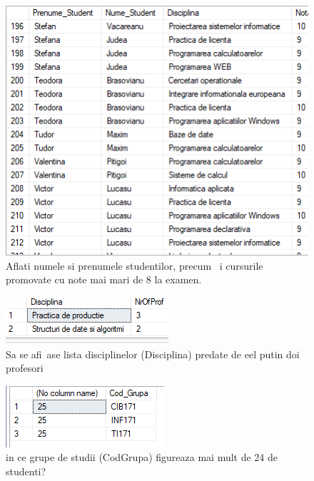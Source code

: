 \documentclass[12pt]{article}
\begin{document}
        \begin{figure}[H]
                \centering
                \includegraphics[width=.85\textwidth]{img14.png}
                \caption{Aflati numele si prenumele studentilor, precum ~i cursurile promovate cu note mai mari de 8 la examen.}
        \end{figure}
        \vspace{0.5 cm}

        \begin{figure}[H]
                \centering
                \includegraphics[width=.37\textwidth]{img24.png}
                \caption{Sa se afi~ase lista disciplinelor (Disciplina) predate de eel putin doi profesori }
        \end{figure}
        \vspace{0.5 cm}

        \begin{figure}[H]
                \centering
                \includegraphics[width=.38\textwidth]{img25.png}
                \caption{in ce grupe de studii (CodGrupa) figureaza mai mult de 24 de studenti?  }
        \end{figure}
        \vspace{0.5 cm}
\end{document}
